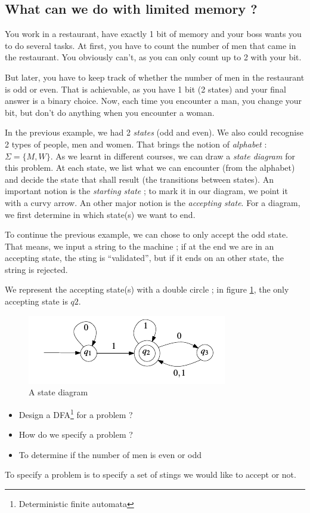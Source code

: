 \documentclass[12pt,a4paper]{article}
\newcommand{\<}{\langle}
\renewcommand{\>}{\rangle}
\begin{document}
\subsection{What can we do with limited memory ?}
\begin{exemple}
	You work in a restaurant, have exactly 1 bit of memory and your boss wants you to do several tasks. At first, you have to count the number of men that came in the restaurant. You obviously can't, as you can only count up to 2 with your bit. 
	
	But later, you have to keep track of whether the number of men in the restaurant is odd or even. That is achievable, as you have 1 bit (2 states) and your final answer is a binary choice. Now, each time you encounter a man, you change your bit, but don't do anything when you encounter a woman.
\end{exemple}
In the previous example, we had 2 \textit{states} (odd and even). We also could recognise 2 types of people, men and women. That brings the notion of \textit{alphabet} : $\Sigma = \{M, W\}$. As we learnt in different courses, we can draw a \textit{state diagram} for this problem. At each state, we list what we can encounter (from the alphabet) and decide the state that shall result (the transitions between states). An important notion is the \textit{starting state} ; to mark it in our diagram, we point it with a curvy arrow. An other major notion is the \textit{accepting state}. For a diagram, we first determine in which state(s) we want to end. 
\begin{exemple}
	To continue the previous example, we can chose to only accept the odd state. That means, we input a string to the machine ; if at the end we are in an accepting state, the sting is ``validated'', but if it ends on an other state, the string is rejected.
\end{exemple}
We represent the accepting state(s) with a double circle ; in figure \ref{fig: state diagram}, the only accepting state is $q2$.
\begin{figure}
	\centering
	\includegraphics[scale=0.5]{images/states}
	\caption{A state diagram}
	\label{fig: state diagram}
\end{figure}
\begin{itemize}
	\item 	Design a DFA\footnote{Deterministic finite automata} for a problem ?
	\item 	How do we specify a problem ?
	\item 	To determine if the number of men is even or odd
\end{itemize}
To specify a problem is to specify a set of stings we would like to accept or not. 
\end{document}
